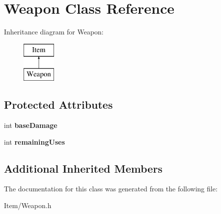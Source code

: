 \hypertarget{classWeapon}{\section{Weapon Class Reference}
\label{classWeapon}
}
Inheritance diagram for Weapon\-:\begin{figure}[H]
\begin{center}
\leavevmode
\includegraphics[height=2.000000cm]{classWeapon}
\end{center}
\end{figure}
\subsection*{Protected Attributes}
\begin{DoxyCompactItemize}
\item 
\hypertarget{classWeapon_a507937307f9f92fc29b4b6827d85585a}{int {\bfseries base\-Damage}}\label{classWeapon_a507937307f9f92fc29b4b6827d85585a}

\item 
\hypertarget{classWeapon_abbc826be5477aa791910f871d76a1da2}{int {\bfseries remaining\-Uses}}\label{classWeapon_abbc826be5477aa791910f871d76a1da2}

\end{DoxyCompactItemize}
\subsection*{Additional Inherited Members}


The documentation for this class was generated from the following file\-:\begin{DoxyCompactItemize}
\item 
Item/Weapon.\-h\end{DoxyCompactItemize}

